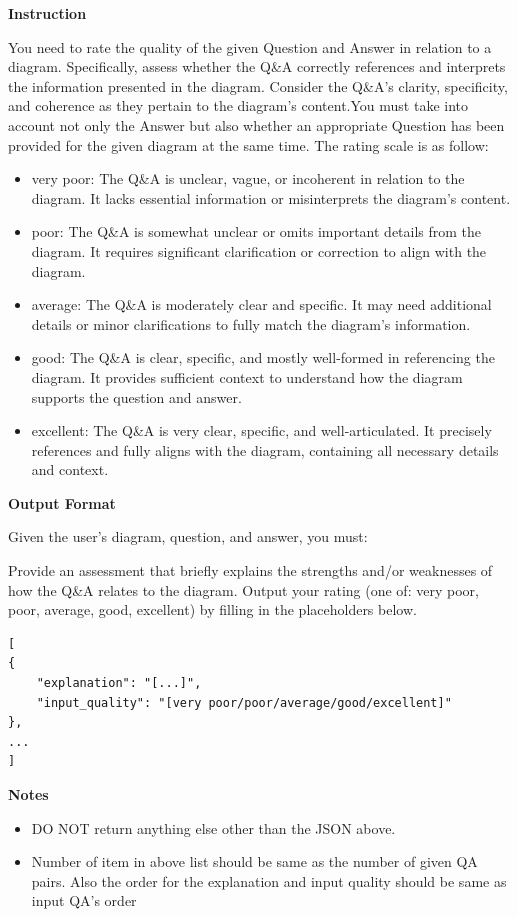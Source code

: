 \begin{tcolorbox}[
    colback=white,
    colframe=gray!20,
    arc=10pt,
    boxrule=1pt,
    title={\textcolor{white}{\textbf{Prompt for VLM-as-a-Judge Evaluation of Question-Answer Pairs}}},
    coltitle=white,
    fonttitle=\large,
    colbacktitle=black!70,
]
\textbf{Instruction}

You need to rate the quality of the given Question and Answer in relation to a diagram. Specifically, assess whether the Q\&A correctly references and interprets the information presented in the diagram. Consider the Q\&A’s clarity, specificity, and coherence as they pertain to the diagram’s content.You must take into account not only the Answer but also whether an appropriate Question has been provided for the given diagram at the same time.
The rating scale is as follow:

\begin{itemize}
    \item very poor: The Q\&A is unclear, vague, or incoherent in relation to the diagram. It lacks essential information or misinterprets the diagram’s content.
    \item poor: The Q\&A is somewhat unclear or omits important details from the diagram. It requires significant clarification or correction to align with the diagram.
    \item average: The Q\&A is moderately clear and specific. It may need additional details or minor clarifications to fully match the diagram’s information.
    \item good: The Q\&A is clear, specific, and mostly well-formed in referencing the diagram. It provides sufficient context to understand how the diagram supports the question and answer.
    \item excellent: The Q\&A is very clear, specific, and well-articulated. It precisely references and fully aligns with the diagram, containing all necessary details and context.
\end{itemize}

\textbf{Output Format}


Given the user’s diagram, question, and answer, you must:

Provide an assessment that briefly explains the strengths and/or weaknesses of how the Q\&A relates to the diagram.
Output your rating (one of: very poor, poor, average, good, excellent) by filling in the placeholders below.

\begin{verbatim}
[
{
	"explanation": "[...]",
	"input_quality": "[very poor/poor/average/good/excellent]"
},
...
]
\end{verbatim}

\textbf{Notes}

\begin{itemize}
\item DO NOT return anything else other than the JSON above.
\item Number of item in above list should be same as the number of given QA pairs. Also the order for the explanation and input quality should be same as input QA's order
\end{itemize}

\end{tcolorbox}

